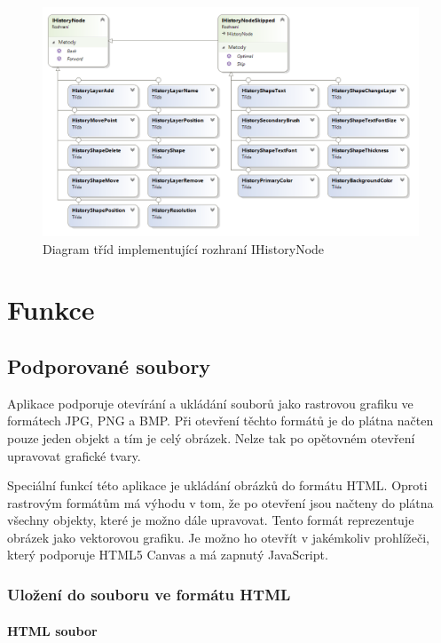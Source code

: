 \documentclass[
  field=inf,
  biblatex=false,
  glossaries,
  index
]{kidiplom}
\begin{document}
\begin{figure}
\includegraphics[width=15cm]{img/history_diag}
\caption{Diagram tříd implementující rozhraní IHistoryNode}
\end{figure}  

\section{Funkce}

\subsection{Podporované soubory}

Aplikace podporuje otevírání a ukládání souborů jako rastrovou grafiku ve formátech JPG, PNG a BMP. Při otevření těchto formátů je do plátna načten pouze jeden objekt a tím je celý obrázek. Nelze tak po opětovném otevření upravovat grafické tvary. 

Speciální funkcí této aplikace je ukládání obrázků do formátu HTML. Oproti rastrovým formátům má výhodu v tom, že po otevření jsou načteny do plátna všechny objekty, které je možno dále upravovat. Tento formát reprezentuje obrázek jako vektorovou grafiku. Je možno ho otevřít v jakémkoliv prohlížeči, který podporuje HTML5 Canvas a má zapnutý JavaScript.

\subsubsection{Uložení do souboru ve formátu HTML}

\paragraph{HTML soubor}
\end{document}
